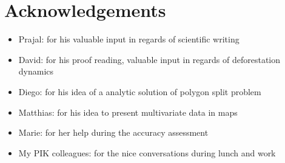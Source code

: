 \chapter*{Acknowledgements}
\label{ch:acknow}
	\begin{itemize}
		\item Prajal: for his valuable input in regards of scientific writing
		\item David: for his proof reading, valuable input in regards of deforestation dynamics
		\item Diego: for his idea of a analytic solution of polygon split problem
		\item Matthias: for his idea to present multivariate data in maps
		\item Marie: for her help during the accuracy assessment
		\item My PIK colleagues: for the nice conversations during lunch and work
	\end{itemize}